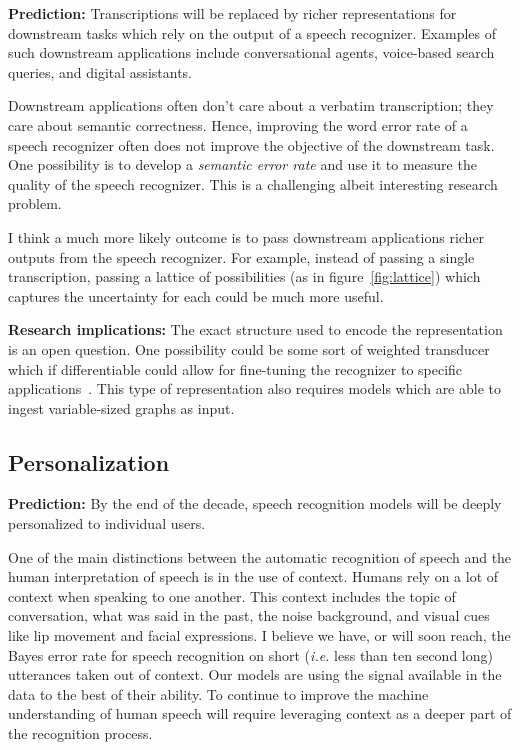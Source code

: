 {\bf Prediction:} Transcriptions will be replaced by richer representations for
downstream tasks which rely on the output of a speech recognizer. Examples of
such downstream applications include conversational agents, voice-based search
queries, and digital assistants.

Downstream applications often don't care about a verbatim transcription; they
care about semantic correctness. Hence, improving the word error rate of a
speech recognizer often does not improve the objective of the downstream task.
One possibility is to develop a \emph{semantic error rate} and use
it to measure the quality of the speech recognizer. This is a challenging
albeit interesting research problem.

I think a much more likely outcome is to pass downstream applications richer
outputs from the speech recognizer. For example, instead of passing a single
transcription, passing a lattice of possibilities (as in
figure~\ref{fig:lattice}) which captures the uncertainty for each could be much
more useful.

{\bf Research implications:} The exact structure used to encode the
representation is an open question. One possibility could be some sort of
weighted transducer which if differentiable could allow for fine-tuning the
recognizer to specific applications~\cite{k2, hannun2020differentiable}. This
type of representation also requires models which are able to ingest
variable-sized graphs as input.

\subsection{Personalization}

{\bf Prediction:} By the end of the decade, speech recognition models will be
deeply personalized to individual users.

One of the main distinctions between the automatic recognition of speech and
the human interpretation of speech is in the use of context. Humans rely on a
lot of context when speaking to one another. This context includes the topic
of conversation, what was said in the past, the noise background, and visual
cues like lip movement and facial expressions. I believe we have, or will soon
reach, the Bayes error rate for speech recognition on short (\emph{i.e.} less
than ten second long) utterances taken out of context. Our models are using the
signal available in the data to the best of their ability.  To continue to
improve the machine understanding of human speech will require leveraging
context as a deeper part of the recognition process.

